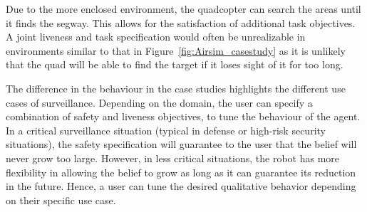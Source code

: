 
Due to the more enclosed  environment, the quadcopter can search the areas until it finds the segway. This allows for the satisfaction of additional task objectives. A joint liveness and task specification would often be unrealizable in environments similar to that in Figure~\ref{fig:Airsim_casestudy} as it is unlikely that the quad will be able to find the target if it loses sight of it for too long. 


The difference in the behaviour in the case studies highlights the different use cases of surveillance. Depending on the domain, the user can specify a combination of safety and liveness objectives, to tune the behaviour of the agent. In a critical surveillance situation (typical in defense or high-risk security situations), the safety specification will guarantee to the user that the belief will never grow too large. However, in less critical situations, the robot has more flexibility in allowing the belief to grow as long as it can guarantee its reduction in the future. Hence, a user can tune the desired qualitative behavior depending on their specific use case. 



